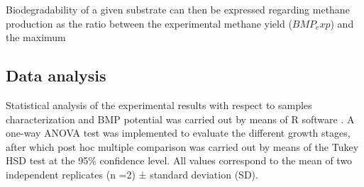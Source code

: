Biodegradability of a given substrate can then be expressed regarding methane production as the ratio between the experimental methane yield ($BMP_exp$) and the maximum 

\subsection{Data analysis}

Statistical analysis of the experimental results with respect to samples characterization and BMP potential was carried out by means of R software \cite{nokey_e6883}. A one-way ANOVA test was implemented to evaluate the different growth stages, after which post hoc multiple comparison was carried out by means of the Tukey HSD test at the 95\% confidence level. All values correspond to the mean of two independent replicates (n =2) ± standard deviation (SD).

